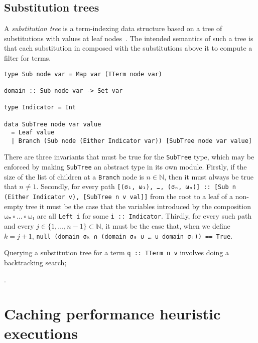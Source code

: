 \documentclass[11pt]{report}
\newcommand{\haskell}[1]{\texttt{#1}}
\newcommand{\mbb}[1]{\ensuremath{\mathbb{#1}}}     %
\newcommand{\sfixme}[0]{%
  \begin{minipage}[c]{3.5em}%
  \todo[color=green!40,inline]{\textsc{fixme}}%
  \end{minipage}}
\newcommand{\comp}[0]{\circ}
\begin{document}
\subsection{Substitution trees}
\label{sec:substitution-trees}

A \textit{substitution tree} is a term-indexing data structure based on a tree
of substitutions with values at leaf nodes~\cite{graf-1994,handbook-ch26}.
The intended semantics of such a tree is that each substitution in composed
with the substitutions above it to compute a filter for terms.

\vspace{-0.5em}
\begin{verbatim}
type Sub node var = Map var (TTerm node var)

domain :: Sub node var -> Set var

type Indicator = Int

data SubTree node var value
  = Leaf value
  | Branch (Sub node (Either Indicator var)) [SubTree node var value]
\end{verbatim}
\vspace{0em}

There are three invariants that must be true for the \haskell{SubTree} type,
which may be enforced by making \haskell{SubTree} an abstract type in its own
module. Firstly, if the size of the list of children at a \haskell{Branch} node
is $n \in \mbb{N}$, then it must always be true that $n \neq 1$. Secondly, for
every path
\texttt{[(\haskell{σ₁}, \haskell{ω₁}), …, (\haskell{σₙ}, \haskell{ωₙ})] \haskell{::} \haskell{[Sub n (Either Indicator v), [SubTree n v val]]}}
from the root to a leaf of a non-empty tree it must be the case that the
variables introduced by the composition $\haskell{ωₙ} \comp \ldots \comp \haskell{ω₁}$ are
all \haskell{Left i} for some \haskell{i :: Indicator}.
Thirdly, for every such path and every $j \in \{1, \ldots, n - 1\} \subset \mbb{N}$,
it must be the case that, when we define $k = j + 1$,
\texttt{\haskell{null} (\haskell{domain} \haskell{σₖ} ∩ (\haskell{domain} \haskell{σ₀} ∪ … ∪ \haskell{domain} \haskell{σⱼ})) \haskell{==} \haskell{True}}.

Querying a substitution tree for a term \haskell{q :: TTerm n v} involves doing
a backtracking search; \sfixme{}.

\section{Caching performance heuristic executions}
\label{sec:heuristic-caching}
\end{document}
